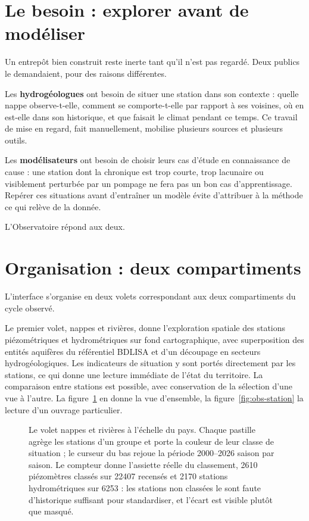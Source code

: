 \section{Le besoin : explorer avant de modéliser}

Un entrepôt bien construit reste inerte tant qu'il n'est pas regardé. Deux publics le
demandaient, pour des raisons différentes.

Les \textbf{hydrogéologues} ont besoin de situer une station dans son contexte : quelle nappe
observe-t-elle, comment se comporte-t-elle par rapport à ses voisines, où en est-elle dans son
historique, et que faisait le climat pendant ce temps. Ce travail de mise en regard, fait
manuellement, mobilise plusieurs sources et plusieurs outils.

Les \textbf{modélisateurs} ont besoin de choisir leurs cas d'étude en connaissance de cause :
une station dont la chronique est trop courte, trop lacunaire ou visiblement perturbée par un
pompage ne fera pas un bon cas d'apprentissage. Repérer ces situations avant d'entraîner un
modèle évite d'attribuer à la méthode ce qui relève de la donnée.

L'Observatoire répond aux deux.

\section{Organisation : deux compartiments}

L'interface s'organise en deux volets correspondant aux deux compartiments du cycle observé.

Le premier volet, nappes et rivières, donne l'exploration spatiale des stations piézométriques
et hydrométriques sur fond cartographique, avec superposition des entités aquifères du référentiel
BDLISA et d'un découpage en secteurs hydrogéologiques. Les indicateurs de situation y sont
portés directement par les stations, ce qui donne une lecture immédiate de l'état du territoire.
La comparaison entre stations est possible, avec conservation de la sélection d'une vue à
l'autre. La figure~\ref{fig:obs-carte-nationale} en donne la vue d'ensemble, la
figure~\ref{fig:obs-station} la lecture d'un ouvrage particulier.

\begin{figure}[htbp]
\centering
{}
\caption{Le volet nappes et rivières à l'échelle du pays. Chaque pastille agrège les stations
d'un groupe et porte la couleur de leur classe de situation ; le curseur du bas rejoue la période
2000--2026 saison par saison. Le compteur donne l'assiette réelle du classement, \num{2610}
piézomètres classés sur \num{22407} recensés et \num{2170} stations hydrométriques sur
\num{6253} : les stations non classées le sont faute d'historique suffisant pour standardiser, et
l'écart est visible plutôt que masqué.}
\label{fig:obs-carte-nationale}
\end{figure}

